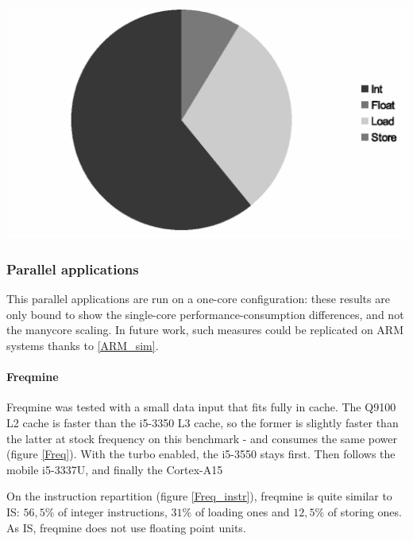 \documentclass{article}
\newenvironment{Figure}
  {\par\medskip\noindent\center\minipage{0.9\linewidth}}
  {\endminipage\par\bigskip\medskip}
\begin{document}
\begin{multicols}{2}
\begin{Figure}
\centering
\includegraphics[width=\linewidth]{IS_instr.eps}
\end{Figure}

\subsubsection{Parallel applications}
This parallel applications are run on a one-core configuration: these results are only bound to show the single-core performance-consumption differences, and not the manycore scaling. In future work, such measures could be replicated on ARM systems thanks to \ref{ARM_sim}.

\paragraph{Freqmine\\}
Freqmine was tested with a small data input that fits fully in cache. The Q9100 L2 cache is faster than the i5-3350 L3 cache, so the former is slightly faster than the latter at stock frequency on this benchmark - and consumes the same power (figure \ref{Freq}). With the turbo enabled, the i5-3550 stays first. Then follows the mobile i5-3337U, and finally the Cortex-A15

On the instruction repartition (figure \ref{Freq_instr}), freqmine is quite similar to IS: $56,5\%$ of integer instructions, $31\%$ of loading ones and $12,5\%$ of storing ones. As IS, freqmine does not use floating point units.


\end{multicols}
\end{document}

